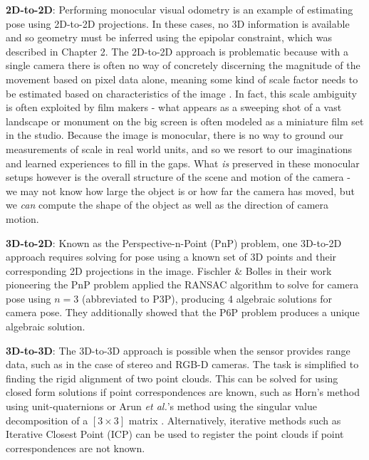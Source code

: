 \textbf{2D-to-2D}: Performing monocular visual odometry is an example of estimating pose using 2D-to-2D projections. In these cases, no 3D information is available and so geometry must be inferred using the epipolar constraint, which was described in Chapter 2. The 2D-to-2D approach is problematic because with a single camera there is often no way of concretely discerning the magnitude of the movement based on pixel data alone, meaning some kind of scale factor needs to be estimated based on characteristics of the image \cite{gakne2018scale, nister2004vo, zhou2016scale, zhou2019scale}. In fact, this scale ambiguity is often exploited by film makers - what appears as a sweeping shot of a vast landscape or monument on the big screen is often modeled as a miniature film set in the studio. Because the image is monocular, there is no way to ground our measurements of scale in real world units, and so we resort to our imaginations and learned experiences to fill in the gaps. What \textit{is} preserved in these monocular setups however is the overall structure of the scene and motion of the camera - we may not know how large the object is or how far the camera has moved, but we \textit{can} compute the  shape of the object as well as the direction of camera motion. 

\textbf{3D-to-2D}: Known as the Perspective-n-Point (PnP) problem, one 3D-to-2D approach requires solving for pose using a known set of 3D points and their corresponding 2D projections in the image. Fischler \& Bolles \cite{bolles1987epiplane} in their work pioneering the PnP problem \cite{bolles1981ransac} applied the RANSAC algorithm to solve for camera pose using $n=3$ (abbreviated to P3P), producing 4 algebraic solutions for camera pose. They additionally showed that the P6P problem produces a unique algebraic solution.

\textbf{3D-to-3D}: The 3D-to-3D approach is possible when the sensor provides range data, such as in the case of stereo and RGB-D cameras. The task is simplified to finding the rigid alignment of two point clouds. This can be solved for using closed form solutions if point correspondences are known, such as Horn's method using unit-quaternions \cite{horn1987absorientation} or Arun \textit{et al.}'s method using the singular value decomposition of a $[3\times3]$ matrix \cite{arun1987svd}. Alternatively, iterative methods such as Iterative Closest Point (ICP) \cite{besl1992icp, medioni1992icp, zhang1994icp} can be used to register the point clouds if point correspondences are not known.


